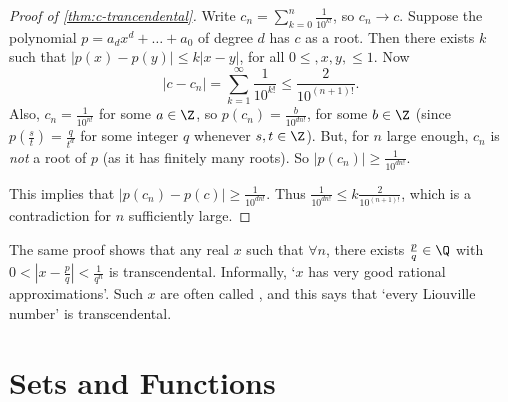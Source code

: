 \begin{center}

\end{center}

\begin{proof}[Proof of \autoref{thm:c-trancendental}]
	Write $c_n = \sum_{k = 0}^{n} \frac{1}{10^{k!}}$, so $c_n \rightarrow c$. Suppose the polynomial $p = a_d x^d + \dots + a_0$ of degree $d$ has $c$ as a root. 
	Then there exists $k$ such that $|p(x) - p(y)| \leq k|x - y|$, for all $0 \leq, x, y, \leq 1$. Now 
	$$|c - c_n| = \sum_{k = 1}^{\infty} \frac{1}{10^{k!}} \leq \frac{2}{10^{(n + 1)!}}.$$
Also, $c_n = \frac{1}{10^{n!}}$ for some $a \in \Z$, so $p(c_n) = \frac{b}{10^{dn!}}$, for some $b \in \Z$ (since $p(\frac{s}{t}) = \frac{q}{t^d}$ for some integer $q$ whenever $s, t \in \Z$).
But, for $n$ large enough, $c_n$ is \emph{not} a root of $p$ (as it has finitely many roots). So $|p(c_n)| \geq \frac{1}{10^{dn!}}$.

This implies that $|p(c_n) - p(c)| \geq \frac{1}{10^{dn!}}$. Thus $\frac{1}{10^{dn!}} \leq k \frac{2}{10^{(n + 1)!}}$, which is a contradiction for $n$ sufficiently large.
\end{proof}

\begin{remark}
	The same proof shows that any real $x$ such that $\forall n$, there exists $\frac{p}{q} \in \Q$ with $0 < |x - \frac{p}{q}| < \frac{1}{q^n}$ is transcendental. Informally, `$x$ has very good rational approximations'. Such $x$ are often called , and this says that `every Liouville number' is transcendental.
\end{remark}


\section{Sets and Functions}

